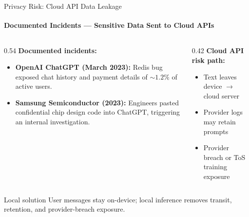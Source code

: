 \begin{frame}[t,shrink=5]{Privacy Risk: Cloud API Data Leakage}
  \framesubtitle{Documented Incidents --- Sensitive Data Sent to Cloud APIs}
  \vspace{-0.2cm}
  \begin{columns}[T,onlytextwidth]
    \begin{column}{0.54\textwidth}
      {\footnotesize\textbf{Documented incidents:}}\\[-0.05cm]
      {\footnotesize\begin{itemize}
        \setlength{\itemsep}{0.25em}
        \setlength{\parskip}{0pt}
        \item \textbf{OpenAI ChatGPT (March 2023):} Redis bug exposed chat history and payment details of ${\sim}1.2\%$ of active users.
        \item \textbf{Samsung Semiconductor (2023):} Engineers pasted confidential chip design code into ChatGPT, triggering an internal investigation.
      \end{itemize}}
    \end{column}
    \begin{column}{0.42\textwidth}
      {\footnotesize\textbf{Cloud API risk path:}}\\[-0.05cm]
      {\footnotesize\begin{itemize}
        \setlength{\itemsep}{0.2em}
        \setlength{\parskip}{0pt}
        \item Text leaves device $\rightarrow$ cloud server
        \item Provider logs may retain prompts
        \item Provider breach or ToS training exposure
      \end{itemize}}
    \end{column}
  \end{columns}
  \vspace{-0.05cm}
  \begin{block}{Local solution}
    {\footnotesize User messages stay on-device; local inference removes transit, retention, and provider-breach exposure.}
  \end{block}
\end{frame}


